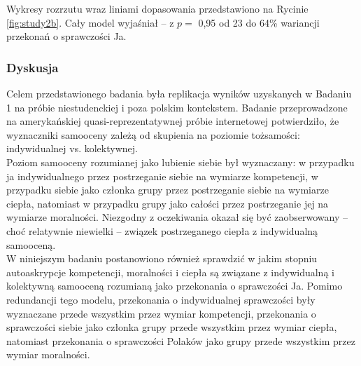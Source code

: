 \documentclass[man]{apa6}
\begin{document}
Wykresy rozrzutu wraz liniami dopasowania przedstawiono na Rycinie \ref{fig:study2b}. Cały model wyjaśniał -- z $p =$ 0,95 od 23 do 64\% wariancji przekonań o sprawczości Ja.\\

\begin{figure*}[htbp]
   \centering
   \caption{Autoaskrypcja cech związanych w wymiarami kompetencji, moralności i ciepła, a poziom przekonań o własnej sprawczości. Punkty oznaczają latentne wyniki dla każdej osoby, z kreskami oznaczającymi błędy pomiarowe. Grubą linią przerywaną oznaczono najlepsze dopasowanie uzyskane w modelu regresyjnym, z cieńszymi liniami oznaczającymi błąd oszacowania.}

   \label{fig:study2b}
\end{figure*}


\subsubsection{Dyskusja}
Celem przedstawionego badania była replikacja wyników uzyskanych w Badaniu 1 na próbie niestudenckiej i poza polskim kontekstem. Badanie przeprowadzone na amerykańskiej quasi-reprezentatywnej próbie internetowej potwierdziło, że wyznaczniki samooceny zależą od skupienia na poziomie tożsamości: indywidualnej vs. kolektywnej.\\
Poziom samooceny rozumianej jako lubienie siebie był wyznaczany: w przypadku ja indywidualnego przez postrzeganie siebie na wymiarze kompetencji, w przypadku siebie jako członka grupy przez postrzeganie siebie na wymiarze ciepła, natomiast w przypadku grupy jako całości przez postrzeganie jej na wymiarze moralności. Niezgodny z oczekiwania okazał się być zaobserwowany -- choć relatywnie niewielki -- związek postrzeganego ciepła z indywidualną samooceną. \\
W niniejszym badaniu postanowiono również sprawdzić w jakim stopniu autoaskrypcje kompetencji, moralności i ciepła są związane z indywidualną i kolektywną samooceną rozumianą jako przekonania o sprawczości Ja. Pomimo redundancji tego modelu, przekonania o indywidualnej sprawczości były wyznaczane przede wszystkim przez wymiar kompetencji, przekonania o sprawczości siebie jako członka grupy przede wszystkim przez wymiar ciepła, natomiast przekonania o sprawczości Polaków jako grupy przede wszystkim przez wymiar moralności.\\


\newpage
\end{document}
